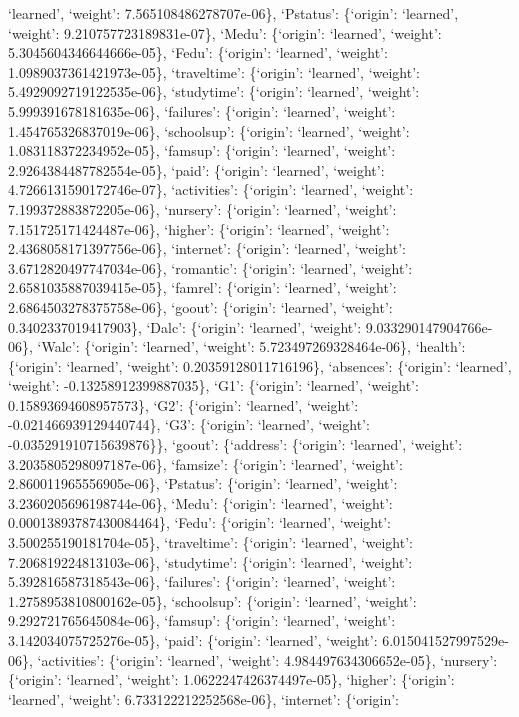 \documentclass[
]{article}
\begin{document}
`learned', `weight': 7.565108486278707e-06\}, `Pstatus': \{`origin':
`learned', `weight': 9.210757723189831e-07\}, `Medu': \{`origin':
`learned', `weight': 5.3045604346644666e-05\}, `Fedu': \{`origin':
`learned', `weight': 1.0989037361421973e-05\}, `traveltime': \{`origin':
`learned', `weight': 5.4929092719122535e-06\}, `studytime': \{`origin':
`learned', `weight': 5.999391678181635e-06\}, `failures': \{`origin':
`learned', `weight': 1.454765326837019e-06\}, `schoolsup': \{`origin':
`learned', `weight': 1.083118372234952e-05\}, `famsup': \{`origin':
`learned', `weight': 2.9264384487782554e-05\}, `paid': \{`origin':
`learned', `weight': 4.7266131590172746e-07\}, `activities': \{`origin':
`learned', `weight': 7.199372883872205e-06\}, `nursery': \{`origin':
`learned', `weight': 7.151725171424487e-06\}, `higher': \{`origin':
`learned', `weight': 2.4368058171397756e-06\}, `internet': \{`origin':
`learned', `weight': 3.6712820497747034e-06\}, `romantic': \{`origin':
`learned', `weight': 2.6581035887039415e-05\}, `famrel': \{`origin':
`learned', `weight': 2.6864503278375758e-06\}, `goout': \{`origin':
`learned', `weight': 0.3402337019417903\}, `Dalc': \{`origin':
`learned', `weight': 9.033290147904766e-06\}, `Walc': \{`origin':
`learned', `weight': 5.723497269328464e-06\}, `health': \{`origin':
`learned', `weight': 0.20359128011716196\}, `absences': \{`origin':
`learned', `weight': -0.13258912399887035\}, `G1': \{`origin':
`learned', `weight': 0.15893694608957573\}, `G2': \{`origin': `learned',
`weight': -0.021466939129440744\}, `G3': \{`origin': `learned',
`weight': -0.035291910715639876\}\}, `goout': \{`address': \{`origin':
`learned', `weight': 3.2035805298097187e-06\}, `famsize': \{`origin':
`learned', `weight': 2.860011965556905e-06\}, `Pstatus': \{`origin':
`learned', `weight': 3.2360205696198744e-06\}, `Medu': \{`origin':
`learned', `weight': 0.00013893787430084464\}, `Fedu': \{`origin':
`learned', `weight': 3.500255190181704e-05\}, `traveltime': \{`origin':
`learned', `weight': 7.206819224813103e-06\}, `studytime': \{`origin':
`learned', `weight': 5.392816587318543e-06\}, `failures': \{`origin':
`learned', `weight': 1.2758953810800162e-05\}, `schoolsup': \{`origin':
`learned', `weight': 9.292721765645084e-06\}, `famsup': \{`origin':
`learned', `weight': 3.142034075725276e-05\}, `paid': \{`origin':
`learned', `weight': 6.015041527997529e-06\}, `activities': \{`origin':
`learned', `weight': 4.984497634306652e-05\}, `nursery': \{`origin':
`learned', `weight': 1.0622247426374497e-05\}, `higher': \{`origin':
`learned', `weight': 6.733122212252568e-06\}, `internet': \{`origin':
\end{document}
